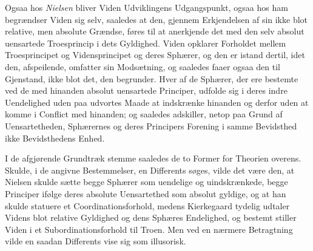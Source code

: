 \documentclass[12pt,a4paper]{book}
\begin{document}
Ogsaa hos \emph{Nielsen} bliver Viden Udviklingens Udgangspunkt, ogsaa hos ham
begrændser Viden sig selv, saaledes at den, gjennem Erkjendelsen af sin ikke
blot relative, men absolute Grændse, føres til at anerkjende det med den selv
absolut uensartede Troesprincip i dets Gyldighed. Viden opklarer Forholdet
mellem Troesprincipet og Vidensprincipet og deres Sphærer, og den er istand
dertil, idet den, afspeilende, omfatter sin Modsætning, og saaledes faaer ogsaa
den til Gjenstand, ikke blot det, den begrunder. Hver af de Sphærer, der ere
bestemte ved de med hinanden absolut uensartede Principer, udfolde sig i deres
indre Uendelighed uden paa udvortes Maade at indskrænke hinanden og derfor uden
at komme i Conflict med hinanden; og saaledes adskiller, netop paa Grund af
Uensartetheden, Sphærernes og deres Principers Forening i samme Bevidsthed ikke
Bevidsthedens Enhed.

I de afgjørende Grundtræk stemme saaledes de to Former for Theorien overens.
Skulde, i de angivne Bestemmelser, en Differents søges, vilde det være den, at
Nielsen skulde sætte begge Sphærer som uendelige og uindskrænkede, begge
Principer ifølge deres absolute Uensartethed som absolut gyldige, og at han
skulde statuere et Coordinationsforhold, medens Kierkegaard tydelig udtaler
Videns blot relative Gyldighed og dens Sphæres Endelighed, og bestemt stiller
Viden i et Subordinationsforhold til Troen. Men ved en nærmere Betragtning vilde
en saadan Differents vise sig som illusorisk.
\end{document}
